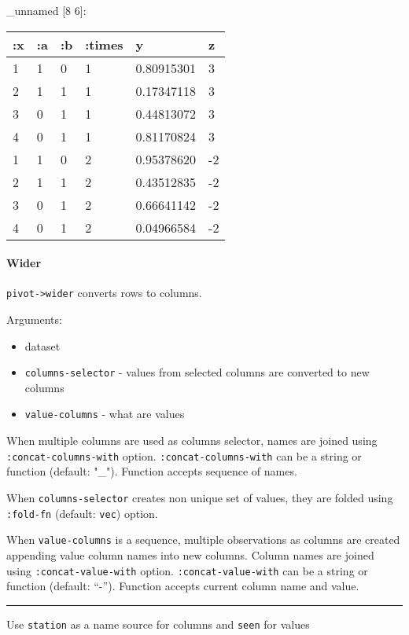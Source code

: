 \documentclass[]{article}
\providecommand{\tightlist}{%
  \setlength{\itemsep}{0pt}\setlength{\parskip}{0pt}}
\let\oldparagraph\paragraph
\renewcommand{\paragraph}[1]{\oldparagraph{#1}\mbox{}}
\begin{document}
\_unnamed {[}8 6{]}:

\begin{longtable}[]{@{}llllll@{}}
\toprule
:x & :a & :b & :times & y & z\tabularnewline
\midrule
\endhead
1 & 1 & 0 & 1 & 0.80915301 & 3\tabularnewline
2 & 1 & 1 & 1 & 0.17347118 & 3\tabularnewline
3 & 0 & 1 & 1 & 0.44813072 & 3\tabularnewline
4 & 0 & 1 & 1 & 0.81170824 & 3\tabularnewline
1 & 1 & 0 & 2 & 0.95378620 & -2\tabularnewline
2 & 1 & 1 & 2 & 0.43512835 & -2\tabularnewline
3 & 0 & 1 & 2 & 0.66641142 & -2\tabularnewline
4 & 0 & 1 & 2 & 0.04966584 & -2\tabularnewline
\bottomrule
\end{longtable}

\hypertarget{wider}{%
\paragraph{Wider}\label{wider}}

\texttt{pivot-\textgreater{}wider} converts rows to columns.

Arguments:

\begin{itemize}
\tightlist
\item
  dataset
\item
  \texttt{columns-selector} - values from selected columns are converted
  to new columns
\item
  \texttt{value-columns} - what are values
\end{itemize}

When multiple columns are used as columns selector, names are joined
using \texttt{:concat-columns-with} option.
\texttt{:concat-columns-with} can be a string or function (default:
"\_"). Function accepts sequence of names.

When \texttt{columns-selector} creates non unique set of values, they
are folded using \texttt{:fold-fn} (default: \texttt{vec}) option.

When \texttt{value-columns} is a sequence, multiple observations as
columns are created appending value column names into new columns.
Column names are joined using \texttt{:concat-value-with} option.
\texttt{:concat-value-with} can be a string or function (default:
``-''). Function accepts current column name and value.

\begin{center}\rule{0.5\linewidth}{0.5pt}\end{center}

Use \texttt{station} as a name source for columns and \texttt{seen} for
values
\end{document}
